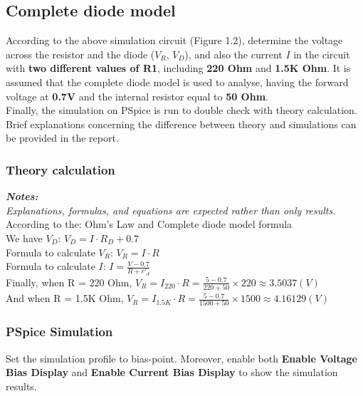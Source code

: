 \subsection{Complete diode model}
According to the above simulation circuit (Figure 1.2), determine the voltage across the resistor and the diode ($V_{R}$, $V_{D}$), and also the current $I$ in the circuit with \textbf{two different values of R1}, including \textbf{220 Ohm} and \textbf{1.5K Ohm}. It is assumed that the complete diode model is used to analyse, having the forward voltage at \textbf{0.7V} and the internal resistor equal to \textbf{50 Ohm}.\\

Finally, the simulation on PSpice is run to double check with theory calculation. Brief explanations concerning the difference between theory and simulations can be provided in the report.\\

\subsubsection{Theory calculation}
\textit{\textbf{Notes:}}\\
\textit{Explanations, formulas, and equations are expected rather than only results.}\\

According to the: Ohm's Law and Complete diode model formula\bigskip\\
We have $V_{D}$: $V_D = I \cdot R_D + 0.7$\bigskip\\
Formula to calculate $V_{R}$: $ V_R = I \cdot R $\bigskip\\
Formula to calculate $I$: $I = \frac{V - 0.7}{R + r'_d}$\bigskip\\
Finally, when R = 220 Ohm, $V_{R} = I_{220} \cdot R = \frac{5-0.7}{220 + 50} \times 220 \approx 3.5037 (V)$ \bigskip\\
And when R = 1.5K Ohm, $V_{R} = I_{1.5K}\cdot R =\frac{5-0.7}{1500+50} \times 1500 \approx 4.16129 (V)$ \bigskip\\


\subsubsection{PSpice Simulation}
Set the simulation profile to bias-point. Moreover, enable both \textbf{Enable Voltage Bias Display} and \textbf{Enable Current Bias Display} to show the simulation results. \\


